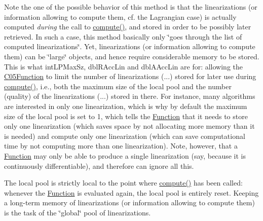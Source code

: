 Note the one of the possible behavior of this method is that the linearizations (or information allowing to compute them, cf. the Lagrangian case) is actually computed {\itshape during} the call to \mbox{\hyperlink{class_s_m_spp__di__unipi__it_1_1_function_a504d4e3e174c7a518cc66156a8a45ce5}{compute()}}, and stored in order to be possibly later retrieved. In such a case, this method basically only \char`\"{}goes through the list of computed linearizations\char`\"{}. Yet, linearizations (or information allowing to compute them) can be \char`\"{}large\char`\"{} objects, and hence require considerable memory to be stored. This is what int\+L\+P\+Max\+Sz, dbl\+R\+Acc\+Lin and dbl\+A\+Acc\+Lin are for\+: allowing the \mbox{\hyperlink{class_s_m_spp__di__unipi__it_1_1_c05_function}{C05\+Function}} to limit the number of linearizations (...) stored for later use during \mbox{\hyperlink{class_s_m_spp__di__unipi__it_1_1_function_a504d4e3e174c7a518cc66156a8a45ce5}{compute()}}, i.\+e., both the maximum size of the local pool and the number (quality) of the linearizations (...) stored in there. For instance, many algorithms are interested in only one linearization, which is why by default the maximum size of the local pool is set to 1, which tells the \mbox{\hyperlink{class_s_m_spp__di__unipi__it_1_1_function}{Function}} that it needs to store only one linearization (which saves space by not allocating more memory than it is needed) and compute only one linearization (which can save computational time by not computing more than one linearization). Note, however, that a \mbox{\hyperlink{class_s_m_spp__di__unipi__it_1_1_function}{Function}} may only be able to produce a single linearization (say, because it is continuously differentiable), and therefore can ignore all this.

The local pool is strictly local to the point where \mbox{\hyperlink{class_s_m_spp__di__unipi__it_1_1_function_a504d4e3e174c7a518cc66156a8a45ce5}{compute()}} has been called\+: whenever the \mbox{\hyperlink{class_s_m_spp__di__unipi__it_1_1_function}{Function}} is evaluated again, the local pool is entirely reset. Keeping a long-\/term memory of linearizations (or information allowing to compute them) is the task of the \char`\"{}global\char`\"{} pool of linearizations. \mbox{\label{class_s_m_spp__di__unipi__it_1_1_c05_function_a93f1297e7910e91cc18b303376191026}} 
